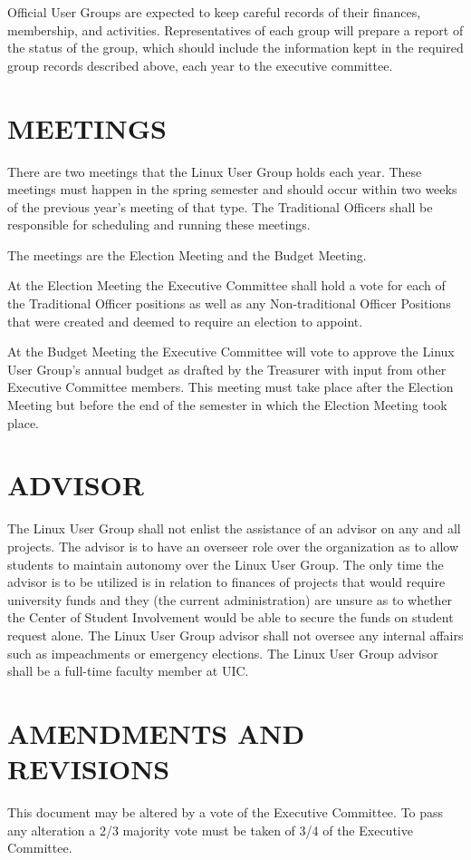 \documentclass[letter]{report}
\begin{document}
Official User Groups are expected to keep careful records of their finances,
membership, and activities. Representatives of each group will prepare a report
of the status of the group, which should include the information kept in the
required group records described above, each year to the executive committee.


\chapter{MEETINGS}
There are two meetings that the Linux User Group holds each year. These meetings
must happen in the spring semester and should occur within two weeks of the
previous year's meeting of that type. The Traditional Officers shall be
responsible for scheduling and running these meetings.

The meetings are the Election Meeting and the Budget Meeting.

At the Election Meeting the Executive Committee shall hold a vote for each of
the Traditional Officer positions as well as any Non-traditional Officer
Positions that were created and deemed to require an election to appoint.

At the Budget Meeting the Executive Committee will vote to approve the Linux
User Group's annual budget as drafted by the Treasurer with input from other
Executive Committee members. This meeting must take place after the Election
Meeting but before the end of the semester in which the Election Meeting took
place.


\chapter{ADVISOR}
The Linux User Group shall not enlist the assistance of an advisor on any and
all projects. The advisor is to have an overseer role over the organization as
to allow students to maintain autonomy over the Linux User Group. The only time
the advisor is to be utilized is in relation to finances of projects that would
require university funds and they (the current administration) are unsure as to
whether the Center of Student Involvement would be able to secure the funds on
student request alone. The Linux User Group advisor shall not oversee any
internal affairs such as impeachments or emergency elections. The Linux User
Group advisor shall be a full-time faculty member at UIC.


\chapter{AMENDMENTS AND REVISIONS}
This document may be altered by a vote of the Executive Committee. To pass any
alteration a 2/3 majority vote must be taken of 3/4 of the Executive Committee.
\end{document}
